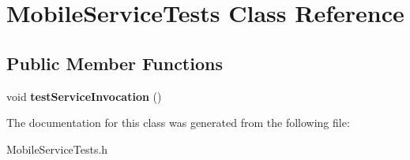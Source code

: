 \hypertarget{interface_mobile_service_tests}{
\section{\-Mobile\-Service\-Tests \-Class \-Reference}
\label{interface_mobile_service_tests}
}
\subsection*{\-Public \-Member \-Functions}
\begin{DoxyCompactItemize}
\item 
\hypertarget{interface_mobile_service_tests_a5b10ef2cc883235fa86bce3770e3cdaf}{
void {\bfseries test\-Service\-Invocation} ()}
\label{interface_mobile_service_tests_a5b10ef2cc883235fa86bce3770e3cdaf}

\end{DoxyCompactItemize}


\-The documentation for this class was generated from the following file\-:\begin{DoxyCompactItemize}
\item 
\-Mobile\-Service\-Tests.\-h\end{DoxyCompactItemize}
